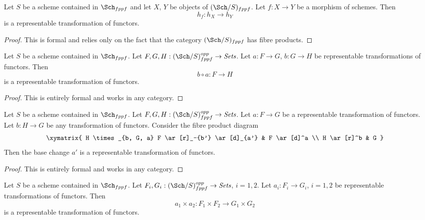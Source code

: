 \begin{lemma}
\label{lemma-morphism-schemes-gives-representable-transformation}
Let $S$ be a scheme contained in $\Sch_{fppf}$ and let
$X$, $Y$ be objects of $(\Sch/S)_{fppf}$.
Let $f : X \to Y$ be a morphism of schemes.
Then
$$
h_f : h_X \longrightarrow h_Y
$$
is a representable transformation of functors.
\end{lemma}

\begin{proof}
This is formal and relies only on the fact that
the category $(\Sch/S)_{fppf}$ has fibre products.
\end{proof}

\begin{lemma}
\label{lemma-composition-representable-transformations}
Let $S$ be a scheme contained in $\Sch_{fppf}$.
Let $F, G, H : (\Sch/S)_{fppf}^{opp} \to \textit{Sets}$.
Let $a : F \to G$, $b : G \to H$ be representable transformations of functors.
Then
$$
b \circ a : F \longrightarrow H
$$
is a representable transformation of functors.
\end{lemma}

\begin{proof}
This is entirely formal and works in any category.
\end{proof}

\begin{lemma}
\label{lemma-base-change-representable-transformations}
Let $S$ be a scheme contained in $\Sch_{fppf}$.
Let $F, G, H : (\Sch/S)_{fppf}^{opp} \to \textit{Sets}$.
Let $a : F \to G$ be a representable transformation of functors.
Let $b : H \to G$ be any transformation of functors.
Consider the fibre product diagram
$$
\xymatrix{
H \times_{b, G, a} F \ar[r]_-{b'} \ar[d]_{a'} & F \ar[d]^a \\
H \ar[r]^b & G
}
$$
Then the base change $a'$ is a representable transformation of functors.
\end{lemma}

\begin{proof}
This is entirely formal and works in any category.
\end{proof}

\begin{lemma}
\label{lemma-product-representable-transformations}
Let $S$ be a scheme contained in $\Sch_{fppf}$.
Let $F_i, G_i : (\Sch/S)_{fppf}^{opp} \to \textit{Sets}$, $i = 1, 2$.
Let $a_i : F_i \to G_i$, $i = 1, 2$
be representable transformations of functors.
Then
$$
a_1 \times a_2 : F_1 \times F_2 \longrightarrow G_1 \times G_2
$$
is a representable transformation of functors.
\end{lemma}

